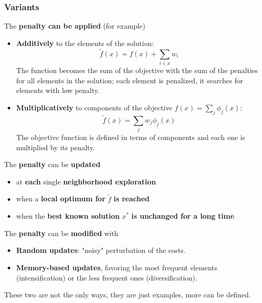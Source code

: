 \documentclass[11pt]{article}
\begin{document}
	\newpage
	
	\subsubsection{Variants}
	
	The \textbf{penalty can be applied} (for example)
	\begin{itemize}
		\item \textbf{Additively} to the elements of the solution:
		$$ \tilde{f} (x) = f (x) + \sum_{i \in x} w_i $$
		The function becomes the sum of the objective with the sum of the penalties for all elements in the solution; each element is penalized, it searches for elements with low penalty.\\
		
		\item \textbf{Multiplicatively} to components of the objective $f (x) = \sum_j \phi_j (x)$:
		$$ \tilde{f} (x) = \sum_j w_j \phi_j (x) $$
		The objective function is defined in terms of components and each one is multiplied by its penalty.\\
	\end{itemize}
	
	The \textbf{penalty} can be \textbf{updated}
	\begin{itemize}
		\item at \textbf{each} single \textbf{neighborhood exploration}
		
		\item when a \textbf{local optimum for} $\tilde{f}$ \textbf{is reached}
		
		\item when the \textbf{best known solution} $x^\ast$ \textbf{is unchanged for a long time}
	\end{itemize}
	\nn
	
	The \textbf{penalty} can be \textbf{modified} with
	\begin{itemize}
		\item \textbf{Random updates}: "noisy" perturbation of the costs.\\
		
		\item \textbf{Memory-based updates}, favoring the most frequent elements (intensification) or the less frequent ones (diversification).\\
	\end{itemize}
	
	These two are not the only ways, they are just examples, more can be defined.\\
	
\end{document}
